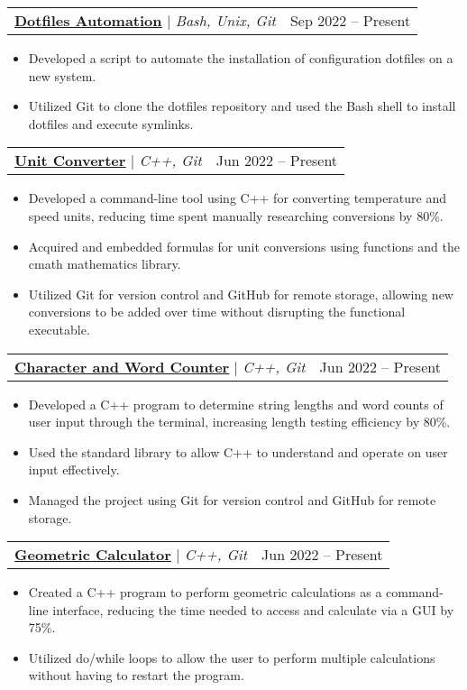 \documentclass[letterpaper,11pt]{article}
\makeatletter
\newcommand{\resumeItem}[1]{
  \item\small{
    {#1 \vspace{-2pt}}
  }
}
\newcommand{\resumeProjectHeading}[2]{
    \item
    \begin{tabular*}{0.97\textwidth}{l@{\extracolsep{\fill}}r}
      \small#1 & #2 \\
    \end{tabular*}\vspace{-7pt}
}
\newcommand{\resumeItemListStart}{\begin{itemize}}
\newcommand{\resumeItemListEnd}{\end{itemize}\vspace{-5pt}}
\makeatother
\begin{document}

    \resumeProjectHeading
      {\href{https://github.com/jamesrobertsjr/dotfiles-macos}{\underline{\textbf{Dotfiles Automation}}} $|$ \emph{Bash, Unix, Git}}{Sep 2022 -- Present}
      \resumeItemListStart
        \resumeItem{Developed a script to automate the installation of configuration dotfiles on a new system.}
        \resumeItem{Utilized Git to clone the dotfiles repository and used the Bash shell to install dotfiles and execute symlinks.}
      \resumeItemListEnd

    \resumeProjectHeading
      {\href{https://github.com/jamesrobertsjr/unit-converter}{\underline{\textbf{Unit Converter}}} $|$ \emph{C++, Git}}{Jun 2022 -- Present}
      \resumeItemListStart
        \resumeItem{Developed a command-line tool using C++ for converting temperature and speed units, reducing time spent manually researching conversions by 80\%.}
        \resumeItem{Acquired and embedded formulas for unit conversions using functions and the cmath mathematics library.}
        \resumeItem{Utilized Git for version control and GitHub for remote storage, allowing new conversions to be added over time without disrupting the functional executable.}
      \resumeItemListEnd

    \resumeProjectHeading
      {\href{https://github.com/jamesrobertsjr/character-and-word-counter}{\underline{\textbf{Character and Word Counter}}} $|$ \emph{C++, Git}}{Jun 2022 -- Present}
      \resumeItemListStart
        \resumeItem{Developed a C++ program to determine string lengths and word counts of user input through the terminal, increasing length testing efficiency by 80\%.}
        \resumeItem{Used the standard library to allow C++ to understand and operate on user input effectively.}
        \resumeItem{Managed the project using Git for version control and GitHub for remote storage.}
      \resumeItemListEnd
    
    \resumeProjectHeading
      {\href{https://github.com/jamesrobertsjr/geometric-calculator}{\underline{\textbf{Geometric Calculator}}} $|$ \emph{C++, Git}}{Jun 2022 -- Present}
      \resumeItemListStart
        \resumeItem{Created a C++ program to perform geometric calculations as a command-line interface, reducing the time needed to access and calculate via a GUI by 75\%.}
        \resumeItem{Utilized do/while loops to allow the user to perform multiple calculations without having to restart the program.}
      \resumeItemListEnd
    
\end{document}
